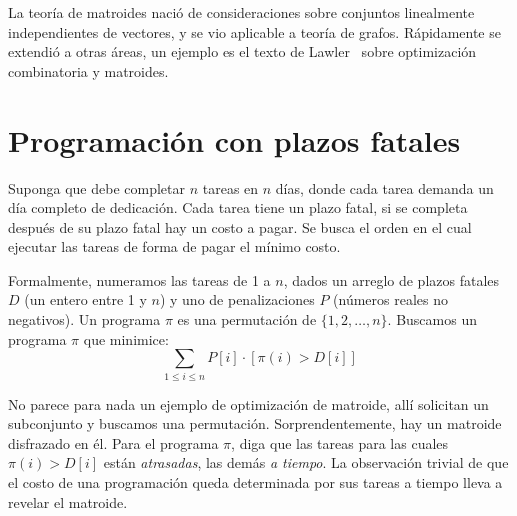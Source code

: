   La teoría de matroides nació de consideraciones
  sobre conjuntos linealmente independientes de vectores,
  y se vio aplicable a teoría de grafos.
  Rápidamente se extendió a otras áreas,
  un ejemplo es el texto de Lawler~%
    \cite{lawler76:_combinatorial_optimization_matroids}
  sobre optimización combinatoria y matroides.

\section{Programación con plazos fatales}
\label{sec:deadline-scheduling}

  Suponga que debe completar \(n\) tareas en \(n\) días,
  donde cada tarea demanda un día completo de dedicación.
  Cada tarea tiene un plazo fatal,
  si se completa después de su plazo fatal hay un costo a pagar.
  Se busca el orden en el cual ejecutar las tareas
  de forma de pagar el mínimo costo.

  Formalmente,
  numeramos las tareas de \num{1} a \(n\),
  dados un arreglo de plazos fatales \(D\)
  (un entero entre \num{1} y \(n\))
  y uno de penalizaciones \(P\)
  (números reales no negativos).
  Un programa \(\pi\) es una permutación de \(\{ 1, 2, \dotsc, n \}\).
  Buscamos un programa \(\pi\) que minimice:
  \begin{equation*}
    \sum_{1 \le i \le n} P[i] \cdot [ \pi(i) > D[i] ]
  \end{equation*}

  No parece para nada un ejemplo de optimización de matroide,
  allí solicitan un subconjunto y buscamos una permutación.
  Sorprendentemente,
  hay un matroide disfrazado en él.
  Para el programa \(\pi\),
  diga que las tareas para las cuales \(\pi(i) > D[i]\)
  están \emph{atrasadas},
  las demás \emph{a tiempo}.
  La observación trivial de que el costo de una programación
  queda determinada por sus tareas a tiempo lleva a revelar el matroide.

